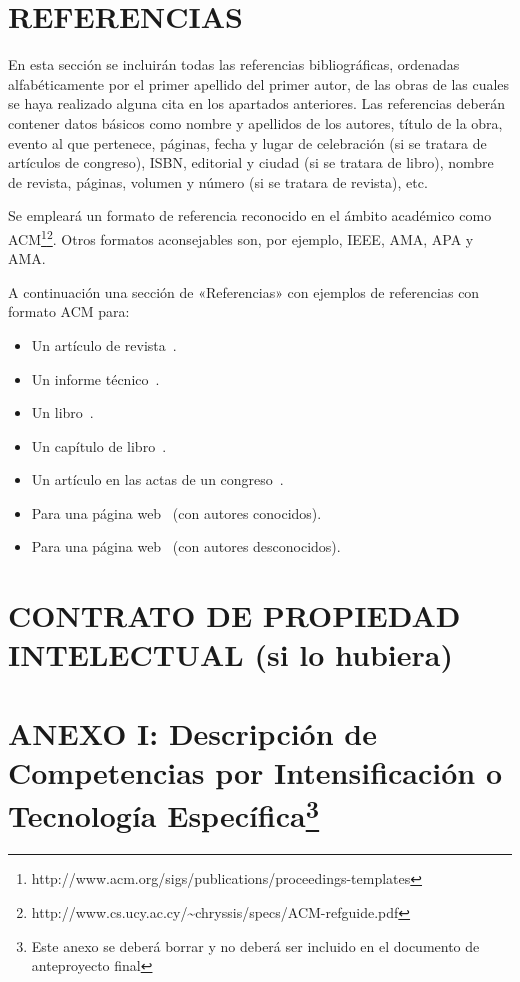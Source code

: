 \documentclass{pre-tfg}
\begin{document}
\section{REFERENCIAS}

En esta sección se incluirán todas las referencias bibliográficas, ordenadas
alfabéticamente por el primer apellido del primer autor, de las obras de las cuales se
haya realizado alguna cita en los apartados anteriores. Las referencias deberán contener
datos básicos como nombre y apellidos de los autores, título de la obra, evento al que
pertenece, páginas, fecha y lugar de celebración (si se tratara de artículos de congreso),
ISBN, editorial y ciudad (si se tratara de libro), nombre de revista, páginas, volumen y
número (si se tratara de revista), etc.

Se empleará un formato de referencia reconocido en el ámbito académico como
ACM\footnote{http://www.acm.org/sigs/publications/proceedings-templates}\footnote{http://www.cs.ucy.ac.cy/\~{}chryssis/specs/ACM-refguide.pdf}.
Otros formatos aconsejables son, por ejemplo, IEEE, AMA, APA y AMA.

A continuación una sección de «Referencias» con ejemplos de referencias con formato ACM para:

\begin{itemize}
\item Un artículo de revista~\cite{Bow93}.
\item Un informe técnico~\cite{Ding97}.
\item Un libro~\cite{Tavel07}.
\item Un capítulo de libro~\cite{Greiner99}.
\item Un artículo en las actas de un congreso~\cite{Frohlic00}.
\item Para una página web~\cite{Steele04} (con autores conocidos).
\item Para una página web~\cite{Oxygen} (con autores desconocidos).
\end{itemize}



\singlespacing


\section{CONTRATO DE PROPIEDAD INTELECTUAL (si lo hubiera)}

\newpage
\section*{ANEXO I: Descripción de Competencias por Intensificación o Tecnología
Específica\footnote{Este anexo se deberá borrar y no deberá ser incluido en el documento de anteproyecto final}}
\end{document}
